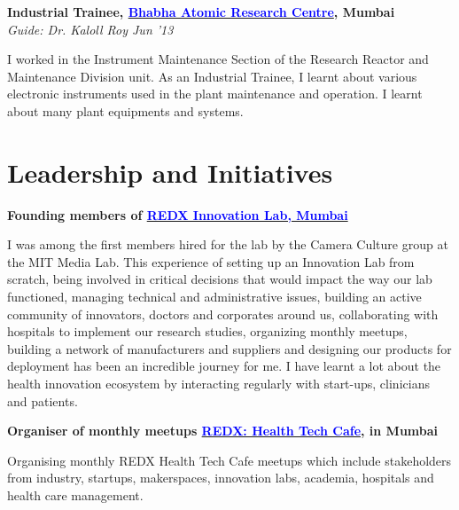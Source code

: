 \documentclass[margin,line]{res}
\newenvironment{list1}{
  \begin{list}{\ding{113}}{%
      \setlength{\itemsep}{0in}
      \setlength{\parsep}{0in} \setlength{\parskip}{0in}
      \setlength{\topsep}{0in} \setlength{\partopsep}{0in}
      \setlength{\leftmargin}{0.17in}}}{\end{list}}
\begin{document}
\begin{resume}
{\bf Industrial Trainee, \href{http://www.barc.gov.in/}{\textcolor{blue}{Bhabha Atomic Research Centre}}, Mumbai} \\
{\em Guide: Dr. Kaloll Roy \hfill {\textit{Jun '13}} }\\
\vspace*{-.13in}
\begin{list1}
\item[]
I worked in the Instrument Maintenance Section of the Research Reactor and Maintenance Division unit. As an Industrial Trainee, I learnt about various electronic instruments used in the plant maintenance and operation. I learnt about many plant equipments and systems.
\end{list1}



\section{\sc Leadership and Initiatives}


{\bf Founding members of \href{https://redxmumbai.com/}{\textcolor{blue} {REDX Innovation Lab, Mumbai}}} \\
\vspace*{-.15in}
\begin{list1}
\item[]
I was among the first members hired for the lab by the Camera Culture group at the MIT Media Lab. This experience of setting up an Innovation Lab from scratch, being involved in critical decisions that would impact the way our lab functioned, managing technical and administrative issues, building an active community of innovators, doctors and corporates around us, collaborating with hospitals to implement our research studies, organizing monthly meetups, building a network of manufacturers and suppliers and designing our products for deployment has been an incredible journey for me. I have learnt a lot about the health innovation ecosystem by interacting regularly with start-ups, clinicians and patients.
\end{list1}


{\bf Organiser of monthly meetups \href{https://www.meetup.com/REDX-Health-Tech-Cafe-Mumbai/}{\textcolor{blue} {REDX: Health Tech Cafe}}, in Mumbai} \\
\vspace*{-.13in}
\begin{list1}
\item[]
Organising monthly REDX Health Tech Cafe meetups which include stakeholders from industry, startups, makerspaces, innovation labs, academia, hospitals and health care  management.
\end{list1}


\end{resume}
\end{document}
